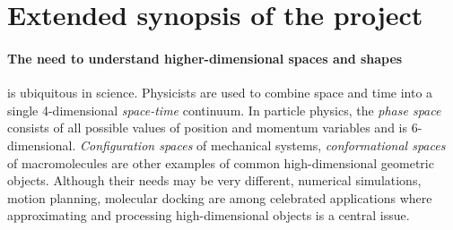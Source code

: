 \section{Extended synopsis of the project}

\paragraph{The need to understand higher-dimensional spaces and shapes}


is ubiquitous in science.  Physicists are used to combine space and time into a single 4-dimensional {\em space-time} continuum.  In particle physics, the {\em phase space} consists of all possible values of position and momentum variables and is 6-dimensional.  {\em Configuration spaces} of mechanical systems, {\em conformational spaces} of macromolecules are other examples of common high-dimensional geometric objects.  Although their needs may be very different, numerical simulations, motion planning, molecular docking are among celebrated applications where approximating and processing high-dimensional objects is a central issue. 


